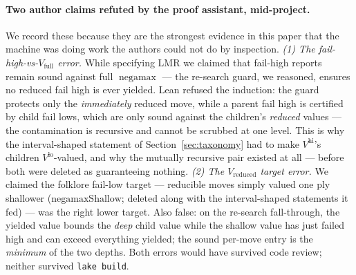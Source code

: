 \documentclass[11pt]{article}
\DeclareMathOperator{\negamax}{negamax}
\newcommand{\Vhi}{V^{\mathrm{hi}}}
\newcommand{\Vlo}{V^{\mathrm{lo}}}
\theoremstyle{plain}
\theoremstyle{definition}
\theoremstyle{remark}
\begin{document}
\paragraph{Two author claims refuted by the proof assistant,
mid-project.}
We record these because they are the strongest evidence in this paper
that the machine was doing work the authors could not do by inspection.
\emph{(1) The fail-high-vs-$V_{\mathrm{full}}$ error.}  While
specifying LMR we claimed that fail-high reports remain sound against
full $\negamax$ --- the re-search guard, we reasoned, ensures no reduced
fail high is ever yielded.  Lean refused the induction: the guard
protects only the \emph{immediately} reduced move, while a parent fail
high is certified by child fail lows, which are only sound against the
children's \emph{reduced} values --- the contamination is recursive and
cannot be scrubbed at one level.  This is why the interval-shaped
statement of Section~\ref{sec:taxonomy} had to make $\Vhi$'s children
$\Vlo$-valued, and why the mutually recursive pair existed at all ---
before both were deleted as guaranteeing nothing.
\emph{(2) The $V_{\mathrm{reduced}}$ target error.}  We claimed the
folklore fail-low target --- reducible moves simply valued one ply
shallower ($\mathrm{negamaxShallow}$; deleted along with the
interval-shaped statements it fed) --- was the right lower target.
Also false: on the re-search
fall-through, the yielded value bounds the \emph{deep} child value while
the shallow value has just failed high and can exceed everything
yielded; the sound per-move entry is the \emph{minimum} of the two
depths.  Both errors would have survived code review; neither survived
\texttt{lake build}.
\end{document}
